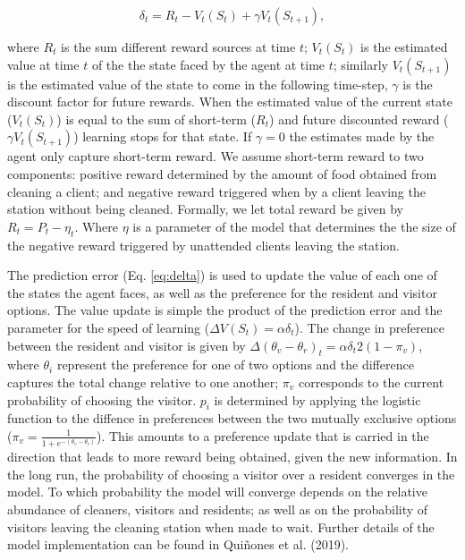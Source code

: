 \documentclass[
  12pt,
]{article}
\begin{document}
\begin{equation}
\label{eq:delta}
\delta_t = R_t -  V_t(S_t) + \gamma V_t(S_{t+1}) ,
\end{equation}

where \(R_t\) is the sum different reward sources at time \(t\);
\(V_t(S_t)\) is the estimated value at time \(t\) of the the state faced
by the agent at time \(t\); similarly \(V_t(S_{t+1})\) is the estimated
value of the state to come in the following time-step, \(\gamma\) is the
discount factor for future rewards. When the estimated value of the
current state (\(V_t(S_t)\)) is equal to the sum of short-term (\(R_t\))
and future discounted reward (\(\gamma V_t(S_{t+1})\)) learning stops
for that state. If \(\gamma = 0\) the estimates made by the agent only
capture short-term reward. We assume short-term reward to two
components: positive reward determined by the amount of food obtained
from cleaning a client; and negative reward triggered when by a client
leaving the station without being cleaned. Formally, we let total reward
be given by \(R_t=P_t - \eta_t\). Where \(\eta\) is a parameter of the
model that determines the the size of the negative reward triggered by
unattended clients leaving the station.

The prediction error (Eq. \ref{eq:delta}) is used to update the value of
each one of the states the agent faces, as well as the preference for
the resident and visitor options. The value update is simple the product
of the prediction error and the parameter for the speed of learning
(\(\Delta V(S_t)=\alpha \delta_t\)). The change in preference between
the resident and visitor is given by
\(\Delta (\theta_v-\theta_r)_t=\alpha\delta_t2(1-\pi_v)\), where
\(\theta_i\) represent the preference for one of two options and the
difference captures the total change relative to one another; \(\pi_v\)
corresponds to the current probability of choosing the visitor. \(p_i\)
is determined by applying the logistic function to the diffence in
preferences between the two mutually exclusive options
(\(\pi_v=\frac{1}{1+e^{-(\theta_v-\theta_r)}}\)). This amounts to a
preference update that is carried in the direction that leads to more
reward being obtained, given the new information. In the long run, the
probability of choosing a visitor over a resident converges in the
model. To which probability the model will converge depends on the
relative abundance of cleaners, visitors and residents; as well as on
the probability of visitors leaving the cleaning station when made to
wait. Further details of the model implementation can be found in
Quiñones et al. (2019).
\end{document}
